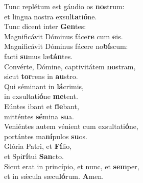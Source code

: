 \evenverse Tunc replétum est gáudio os \textbf{no}strum:~\*\\
\evenverse et lingua nostra exsul\textbf{ta}ti\textbf{ó}ne.\\
\oddverse Tunc dicent inter \textbf{Gen}tes:~\*\\
\oddverse Magnificávit Dóminus fáce\textbf{re} cum \textbf{e}is.\\
\evenverse Magnificávit Dóminus fácere no\textbf{bí}scum:~\*\\
\evenverse facti \textbf{su}mus læ\textbf{tán}tes.\\
\oddverse Convérte, Dómine, captivitátem \textbf{no}stram,~\*\\
\oddverse sicut \textbf{tor}rens in \textbf{au}stro.\\
\evenverse Qui séminant in \textbf{lá}crimis,~\*\\
\evenverse in exsultati\textbf{ó}ne \textbf{me}tent.\\
\oddverse Eúntes ibant et \textbf{fle}bant,~\*\\
\oddverse mitténtes \textbf{sé}mina \textbf{su}a.\\
\evenverse Veniéntes autem vénient cum exsultati\textbf{ó}ne,~\*\\
\evenverse portántes ma\textbf{ní}pulos \textbf{su}os.\\
\oddverse Glória Patri, et \textbf{Fí}lio,~\*\\
\oddverse et Spi\textbf{rí}tui \textbf{San}cto.\\
\evenverse Sicut erat in princípio, et nunc, et \textbf{sem}per,~\*\\
\evenverse et in sǽcula sæcu\textbf{ló}rum. \textbf{A}men.\\
